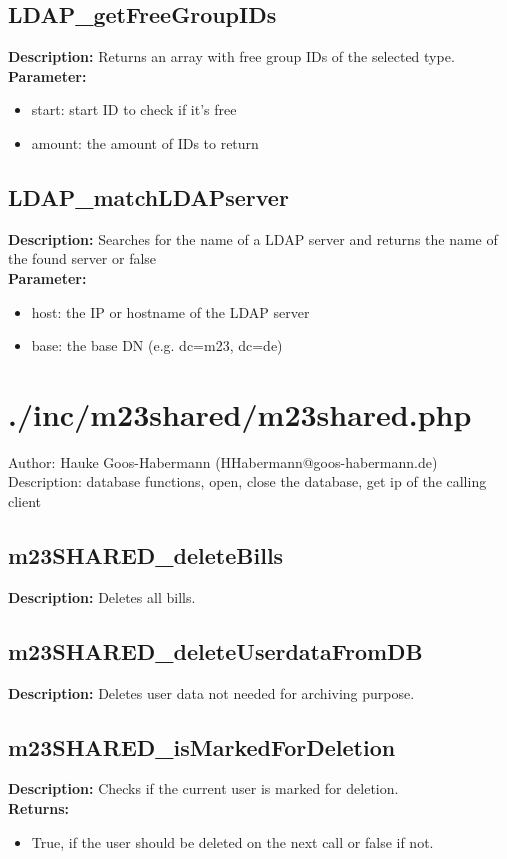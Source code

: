 \subsection{LDAP\_getFreeGroupIDs}
\textbf{Description:} Returns an array with free group IDs of the selected type.\\
\textbf{Parameter:}
\begin{itemize}
\item start: start ID to check if it's free
\item amount: the amount of IDs to return
\end{itemize}

\subsection{LDAP\_matchLDAPserver}
\textbf{Description:} Searches for the name of a LDAP server and returns the name of the found server or false\\
\textbf{Parameter:}
\begin{itemize}
\item host: the IP or hostname of the LDAP server
\item base: the base DN (e.g. dc=m23, dc=de)
\end{itemize}

\newpage\section{./inc/m23shared/m23shared.php}
 Author: Hauke Goos-Habermann (HHabermann@goos-habermann.de)\\
 Description: database functions, open, close the database, get ip of the calling client\\

\subsection{m23SHARED\_deleteBills}
\textbf{Description:} Deletes all bills.\\

\subsection{m23SHARED\_deleteUserdataFromDB}
\textbf{Description:} Deletes user data not needed for archiving purpose.\\

\subsection{m23SHARED\_isMarkedForDeletion}
\textbf{Description:} Checks if the current user is marked for deletion.\\
\textbf{Returns:}
\begin{itemize}
\item True, if the user should be deleted on the next call or false if not.
\end{itemize}

